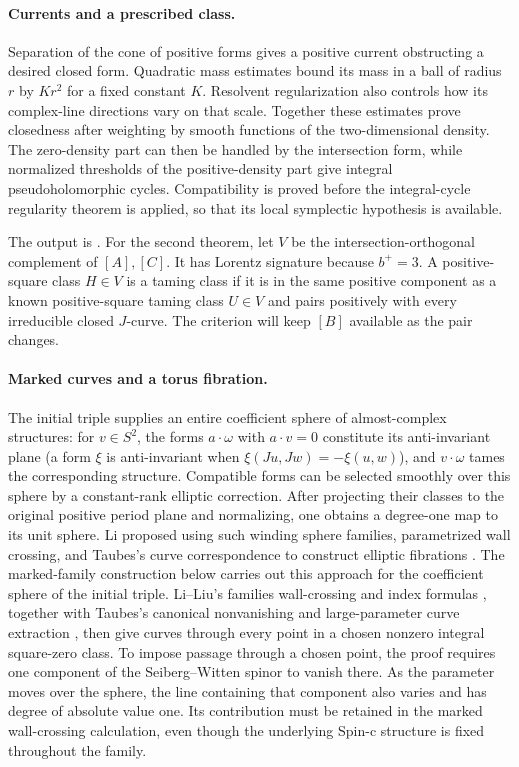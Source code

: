 \paragraph{Currents and a prescribed class.}
Separation of the cone of positive forms gives a positive current
obstructing a desired closed form. Quadratic mass estimates bound its
mass in a ball of radius $r$ by $Kr^2$ for a fixed constant $K$.
Resolvent regularization also
controls how its complex-line directions vary on that scale.
Together these estimates prove closedness after weighting by smooth
functions of the two-dimensional density. The zero-density part can
then be handled by the intersection form, while normalized thresholds
of the positive-density part give integral pseudoholomorphic cycles.
Compatibility is proved before the integral-cycle regularity theorem
is applied, so that its local symplectic hypothesis is available.

The output is .
For the second theorem, let $V$ be the intersection-orthogonal
complement of $[A],[C]$. It has Lorentz signature because $b^+=3$.
A positive-square class $H\in V$ is a taming class if it is in the
same positive component as a known positive-square taming class $U\in V$ and
pairs positively with every irreducible closed $J$-curve. The
criterion will keep $[B]$ available as the pair changes.

\paragraph{Marked curves and a torus fibration.}
The initial triple supplies an entire coefficient sphere of
almost-complex structures: for $v\in S^2$, the forms
$a\cdot\omega$ with $a\cdot v=0$ constitute its anti-invariant plane
(a form $\xi$ is anti-invariant when $\xi(Ju,Jw)=-\xi(u,w)$),
and $v\cdot\omega$ tames the
corresponding structure. Compatible forms can be selected smoothly
over this sphere by a constant-rank elliptic correction. After projecting
their classes to the original positive period plane and normalizing,
one obtains a degree-one map to its unit sphere.
Li proposed using such winding sphere families, parametrized wall crossing,
and Taubes's curve correspondence to construct elliptic fibrations
\cite[Section~7.4.1]{Li2010SCY}. The marked-family construction below
carries out this approach for the coefficient sphere of the initial triple.
Li--Liu's families wall-crossing and index formulas
\cite{LiLiu2001}, together with Taubes's canonical nonvanishing and
large-parameter curve extraction
\cite{Taubes1994,Taubes1996,Taubes1999}, then give curves through every
point in a chosen nonzero integral square-zero class.
To impose passage through a chosen point, the proof requires one
component of the Seiberg--Witten spinor to vanish there. As the parameter moves
over the sphere, the line containing that component also varies and
has degree of absolute value one. Its contribution must be retained
in the marked wall-crossing calculation, even though the underlying
Spin-c structure is fixed throughout the family.

